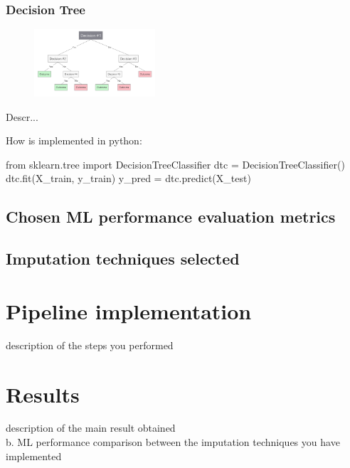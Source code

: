 \documentclass{article}
\begin{document}
\subsubsection*{Decision Tree}
\begin{multicols}{2}
\begin{figure}[H]
        \begin{center}
        \includegraphics[width=0.4\textwidth]{DecTree.png}
        \end{center}
    \end{figure} 
    \columnbreak
\columnbreak
Descr...\\

\end{multicols}
How is implemented in python:
\begin{Python}
from sklearn.tree import DecisionTreeClassifier
dtc = DecisionTreeClassifier()
dtc.fit(X_train, y_train)
y_pred = dtc.predict(X_test)
\end{Python}





\subsection{Chosen ML performance evaluation metrics}
\subsection{Imputation techniques selected}

\section{Pipeline implementation}
description of the steps you performed

\section{Results}
description of the main result obtained\\
b.	ML performance comparison between the imputation techniques you have implemented
\end{document}
